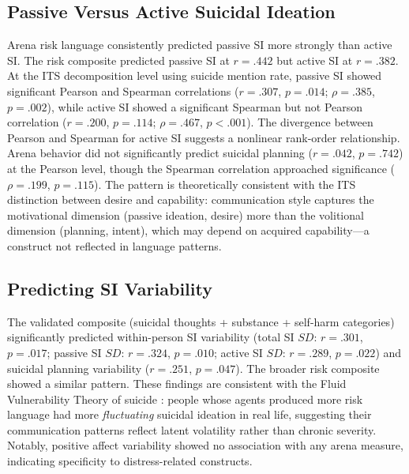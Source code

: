 \documentclass[review,12pt,authoryear]{elsarticle}
\begin{document}
\subsection{Passive Versus Active Suicidal Ideation}

Arena risk language consistently predicted passive SI more strongly than active SI. The risk composite predicted passive SI at $r = .442$ but active SI at $r = .382$. At the ITS decomposition level using suicide mention rate, passive SI showed significant Pearson and Spearman correlations ($r = .307$, $p = .014$; $\rho = .385$, $p = .002$), while active SI showed a significant Spearman but not Pearson correlation ($r = .200$, $p = .114$; $\rho = .467$, $p < .001$). The divergence between Pearson and Spearman for active SI suggests a nonlinear rank-order relationship. Arena behavior did not significantly predict suicidal planning ($r = .042$, $p = .742$) at the Pearson level, though the Spearman correlation approached significance ($\rho = .199$, $p = .115$). The pattern is theoretically consistent with the ITS distinction between desire and capability: communication style captures the motivational dimension (passive ideation, desire) more than the volitional dimension (planning, intent), which may depend on acquired capability---a construct not reflected in language patterns.

\subsection{Predicting SI Variability}

The validated composite (suicidal thoughts + substance + self-harm categories) significantly predicted within-person SI variability (total SI $SD$: $r = .301$, $p = .017$; passive SI $SD$: $r = .324$, $p = .010$; active SI $SD$: $r = .289$, $p = .022$) and suicidal planning variability ($r = .251$, $p = .047$). The broader risk composite showed a similar pattern. These findings are consistent with the Fluid Vulnerability Theory of suicide \citep{bryan2018nonlinear}: people whose agents produced more risk language had more \textit{fluctuating} suicidal ideation in real life, suggesting their communication patterns reflect latent volatility rather than chronic severity. Notably, positive affect variability showed no association with any arena measure, indicating specificity to distress-related constructs.
\end{document}
